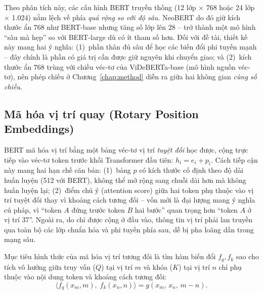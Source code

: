 Theo phân tích này, các cấu hình BERT truyền thống (12 lớp $\times$ 768 hoặc 24 lớp
$\times$ 1.024) nằm lệch về phía \textit{quá rộng so với độ sâu}. NeoBERT do đó giữ kích
thước ẩn $768$ như BERT-base nhưng tăng số lớp lên $28$ -- trở thành một mô hình
``sâu mà hẹp'' so với BERT-large dù có ít tham số hơn. Đối với đề tài, thiết kế này mang
hai ý nghĩa: (1)~phần thân đủ sâu để học các biến đổi phi tuyến mạnh -- đây chính là phần
có giá trị cần được giữ nguyên khi chuyển giao; và (2)~kích thước ẩn $768$ trùng với chiều
véc-tơ của ViDeBERTa-base (mô hình nguồn véc-tơ), nên phép chiếu ở
Chương~\ref{chap:method} diễn ra giữa hai không gian \textit{cùng số chiều}.

\subsection{Mã hóa vị trí quay (Rotary Position Embeddings)}
\label{subsec:rope}

BERT mã hóa vị trí bằng một bảng véc-tơ vị trí \textit{tuyệt đối} học được, cộng trực tiếp
vào véc-tơ token trước khối Transformer đầu tiên: $h_i = e_i + p_i$. Cách tiếp cận này mang
hai hạn chế căn bản: (1)~bảng $p$ có kích thước cố định theo độ dài huấn luyện (512 với BERT),
không thể mở rộng sang chuỗi dài hơn mà không huấn luyện lại; (2)~điểm chú ý (attention score)
giữa hai token phụ thuộc vào vị trí tuyệt đối thay vì khoảng cách tương đối -- vốn mới là đại
lượng mang ý nghĩa cú pháp, vì ``token $A$ đứng trước token $B$ hai bước'' quan trọng hơn
``token $A$ ở vị trí 37''. Ngoài ra, do chỉ được cộng ở đầu vào, thông tin vị trí phải lan
truyền qua toàn bộ các lớp chuẩn hóa và phi tuyến phía sau, dễ bị pha loãng dần trong mạng sâu.

Mục tiêu hình thức của mã hóa vị trí tương đối là tìm hàm biến đổi $f_q, f_k$ sao cho
tích vô hướng giữa truy vấn ($Q$) tại vị trí $m$ và khóa ($K$) tại vị trí $n$ chỉ phụ thuộc vào nội
dung token và khoảng cách tương đối:
\begin{equation}
  \label{eq:rope-goal}
  \bigl\langle f_q(x_m, m),\; f_k(x_n, n) \bigr\rangle = g(x_m,\, x_n,\, m - n).
\end{equation}

